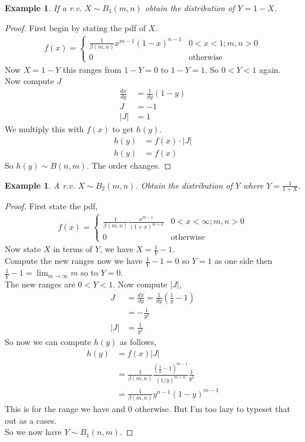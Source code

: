 \documentclass[oneside,11pt,pdftex]{book}%
\numberwithin{equation}{section}
\newtheorem{example}[theorem]{Example}
\numberwithin{section}{chapter}
\numberwithin{equation}{chapter}
\begin{document}
\begin{example}
	If a r.v. $ X \sim B_1(m,n) $ obtain the distribution of $ Y=1-X $.
\end{example}
\begin{proof}
	First begin by stating the pdf of $ X $.
	\begin{align*}
		f(x)=\begin{cases}
			\frac{1}{\beta(m,n)}x^{m-1}(1-x)^{n-1} & 0<x<1; m,n>0\\
			0 & \text{otherwise}
		\end{cases} 
	\end{align*}
	Now $ X=1-Y $ this ranges from $ 1-Y=0 $ to $ 1-Y=1 $. So $ 0<Y<1 $ again.\\
	Now compute $ J $
	\begin{align*}
		\frac{dx}{dy}&=\frac{1}{dy} \left( 1-y \right)\\
		J&=-1\\
		|J|&=1
	\end{align*}
	We multiply this with $ f(x) $ to get $ h(y) $.
	\begin{align*}
		h(y)&=f(x)\cdot |J|\\
		h(y)&= f(x)
	\end{align*}
	So $ h(y)\sim B(n,m) $. The order changes.
\end{proof}

\begin{example}
	A r.v. $ X\sim B_2(m,n) $. Obtain the distribution of $ Y $ where $ Y=\frac{1}{1+X} $.
\end{example}
\begin{proof}
	First state the pdf,
	\begin{align*}
		f(x)=\begin{cases}
			\frac{1}{\beta(m,n)}\frac{x^{m-1}}{(1+x)^{m+n}} & 0<x<\infty; m,n>0\\
			0 & \text{otherwise}
		\end{cases}
	\end{align*}
	Now state $ X $ in terms of $ Y $, we have $ X=\frac{1}{Y}-1 $. \\
	Compute the new ranges now we have $ \frac{1}{Y}-1=0 $ so $ Y=1 $ as one side then $  \frac{1}{Y}-1=\lim_{m \rightarrow \infty} m $ so to $ Y=0 $.\\
	The new ranges are $ 0<Y<1 $.
	Now compute $ |J| $,
	\begin{align*}
		J&=\frac{dx}{dy}= \frac{1}{dy}\left( \frac{1}{y}-1 \right)\\
		&=-\frac{1}{y^2}\\
		|J|&=\frac{1}{y^2}
	\end{align*}
	So now we can compute $ h(y) $ as follows,
	\begin{align*}
		h(y)&=f(x)|J|\\
		&= \frac{1}{\beta(m,n)}\frac{\left( \frac{1}{y}-1\right)^{m-1}}{(1/y)^{m+n}}\frac{1}{y^2}\\
		&=\frac{1}{\beta(m,n)}y^{n-1}(1-y)^{m-1}
	\end{align*}
	This is for the range we have and $ 0 $ otherwise. But I'm too lazy to typeset that out as a cases.\\
	So we now have $ Y \sim B_1(n,m) $.
\end{proof}
\end{document}
